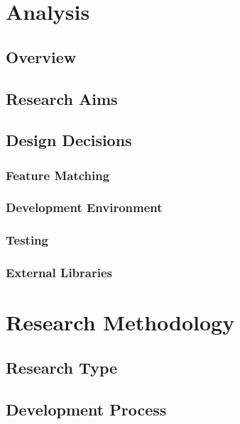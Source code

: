 \section{Analysis}


\subsection{Overview}


\subsection{Research Aims}


\subsection{Design Decisions}

\subsubsection{Feature Matching}

\subsubsection{Development Environment}

\subsubsection{Testing}

\subsubsection{External Libraries}


\section{Research Methodology}

\subsection{Research Type}

\subsection{Development Process}



